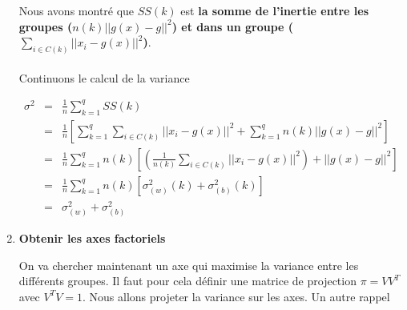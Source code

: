 \documentclass[a4paper, 11pt, onecolumn]{article}
\begin{document}
\begin{enumerate}
Nous avons montré que $SS(k)$ est \textbf{la somme de l'inertie entre les groupes ($n(k) ||g(x)-g||^2$) et dans un groupe ($\sum_{i\in C(k)} ||x_i-g(x)||^2$)}. 

\paragraph{}Continuons le calcul de la variance

\begin{framed}
\begin{eqnarray}
\sigma^2 &=& \frac{1}{n}\sum_{k=1}^q SS(k)\\
&=& \frac{1}{n}\left[\sum_{k=1}^q\sum_{i\in C(k)} ||x_i-g(x)||^2 + \sum_{k=1}^qn(k) ||g(x)-g||^2\right]\\
&=& \frac{1}{n}\sum_{k=1}^q n(k) \left[\left(\frac{1}{n(k)}\sum_{i\in C(k)} ||x_i-g(x)||^2\right)+ ||g(x)-g||^2\right]\\
&=& \frac{1}{n}\sum_{k=1}^q n(k) [\sigma_{(w)}^2(k)+\sigma_{(b)}^2(k)]\\
&=&\sigma_{(w)}^2+\sigma_{(b)}^2
\end{eqnarray}
\end{framed}

\item \textbf{Obtenir les axes factoriels}

On va chercher maintenant un axe qui maximise la variance entre les différents groupes. Il faut pour cela définir une matrice de projection $\pi = VV^T$ avec $V^TV=1$. Nous allons projeter la variance sur les axes. Un autre rappel


\end{enumerate}
\end{document}

